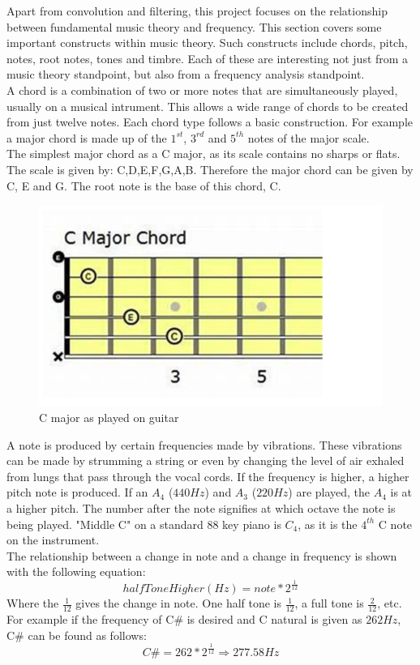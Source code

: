 \documentclass[12pt,a4paper]{article}
\begin{document}
	\normalsize
	Apart from convolution and filtering, this project focuses on the relationship between fundamental music theory and
	frequency. This section covers some important constructs within music theory. Such constructs include chords, pitch,
	notes, root notes, tones and timbre. Each of these are interesting not just from a music theory standpoint, but also
	from a frequency analysis standpoint. \\
	A chord is a combination of two or more notes that are simultaneously played, usually on a musical intrument. This 
	allows a wide range of chords to be created from just twelve notes. Each chord type follows a basic construction. For
	example a major chord is made up of the $1^{st}$, $3^{rd}$ and $5^{th}$ notes of the major scale. \\
	The simplest major chord as a C major, as its scale contains no sharps or flats. The scale is given by:
	C,D,E,F,G,A,B. Therefore the major chord can be given by C, E and G. The root note is the base of this chord, C.\\
\begin{figure}[h]
\begin{center}
		\includegraphics[width=0.7\linewidth]{C_chord}
	\end{center}
	\caption{C major as played on guitar}
\end{figure}
\newpage
\vspace*{5mm}
	A note is produced by certain frequencies made by vibrations. These vibrations can be made by strumming a string or even by changing the level of air exhaled from  lungs that pass through the vocal cords.
	If the frequency is higher, a higher pitch note is produced. If an $A_{4}$ ($440Hz$) and $A_{3}$ ($220Hz$) are played, the 
	$A_{4}$ is at a higher pitch. The number after the note signifies at which octave the note is being played. "Middle C" on
	a standard 88 key piano is $C_{4}$, as it is the $4^{th}$ C note on the instrument.\\
	The relationship between a change in note and a change in frequency is shown with the following equation:
	$$
		halfToneHigher(Hz) = note * 2^{\frac{1}{12}}
	$$
	Where the $\frac{1}{12}$ gives the change in note. One half tone is $\frac{1}{12}$, a full tone is $\frac{2}{12}$, etc.
	For example if the frequency of C\# is desired and C natural is given as $262Hz$, C\# can be found as follows:
	$$
		C\# = 262 * 2^{\frac{1}{12}} \Longrightarrow 277.58Hz
	$$
\end{document}
